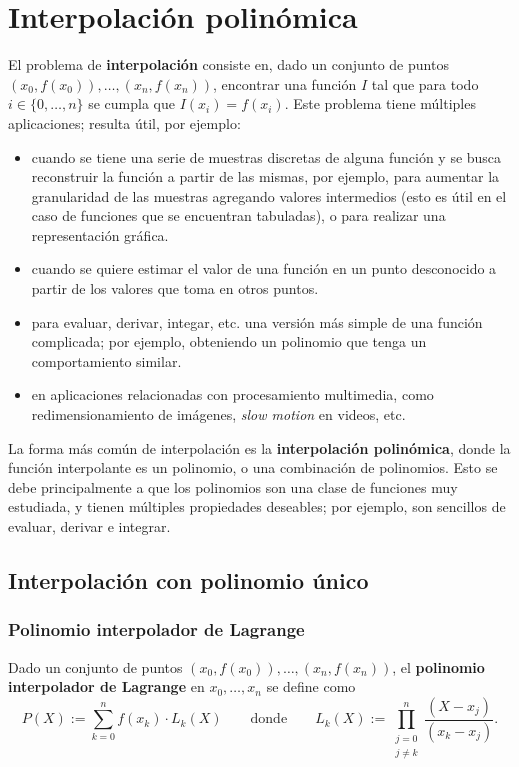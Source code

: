 
\section{Interpolación polinómica}
\label{section:interpolacion}

El problema de \textbf{interpolación} consiste en, dado un conjunto de puntos
$(x_0,f(x_0)), \dots, (x_n,f(x_n))$, encontrar una función $I$ tal que para
todo $i \in \{0,\dots,n\}$ se cumpla que $I(x_i) = f(x_i)$. Este problema
tiene múltiples aplicaciones; resulta útil, por ejemplo:
\begin{itemize}
\item cuando se tiene una serie de muestras discretas de alguna función y se
busca reconstruir la función a partir de las mismas, por ejemplo, para
aumentar la granularidad de las muestras agregando valores intermedios (esto
es útil en el caso de funciones que se encuentran tabuladas), o para realizar
una representación gráfica.
\item cuando se quiere estimar el valor de una función en un punto desconocido
a partir de los valores que toma en otros puntos.
\item para evaluar, derivar, integar, etc. una versión más simple de una
función complicada; por ejemplo, obteniendo un polinomio que tenga un
comportamiento similar.
\item en aplicaciones relacionadas con procesamiento multimedia, como
redimensionamiento de imágenes, \emph{slow motion} en videos, etc.
\end{itemize}

La forma más común de interpolación es la \textbf{interpolación polinómica},
donde la función interpolante es un polinomio, o una combinación de
polinomios. Esto se debe principalmente a que los polinomios son una clase de
funciones muy estudiada, y tienen múltiples propiedades deseables; por
ejemplo, son sencillos de evaluar, derivar e integrar.

\subsection{Interpolación con polinomio único}

\subsubsection{Polinomio interpolador de Lagrange}

Dado un conjunto de puntos $(x_0,f(x_0)), \dots, (x_n,f(x_n))$, el
\textbf{polinomio interpolador de Lagrange} en $x_0, \dots, x_n$ se define
como
\[ P(X) := \sum_{k=0}^n f(x_k) \cdot L_{k}(X)
    \qquad \text{donde} \qquad
    L_{k}(X) := \prod_{\substack{j=0 \\ j \neq k}}^n
    \frac{(X-x_j)}{(x_k-x_j)}. \]

